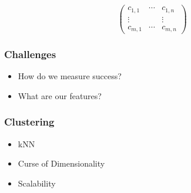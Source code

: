 \begin{frame}
{\begin{displaymath}
\begin{pmatrix}
        c_{1,1} & \cdots & c_{1,n} \\
        \vdots & & \vdots \\
        c_{m,1} & \cdots & c_{m,n}
      \end{pmatrix}
    \end{displaymath}
  }

\end{frame}

\begin{frame}
  \frametitle{Challenges}

  \begin{itemize}
  \item How do we measure success?
  \item What are our features?
  \end{itemize}
\end{frame}

\begin{frame}
  \frametitle{Clustering}

  \begin{itemize}
  \item kNN 
  \item Curse of Dimensionality
  \item Scalability 
  \end{itemize}
\end{frame}


